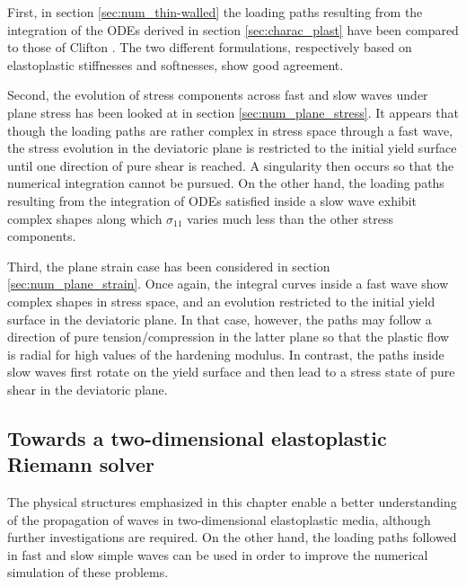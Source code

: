 First, in section \ref{sec:num_thin-walled} the loading paths resulting from the integration of the ODEs derived in section \ref{sec:charac_plast} have been compared to those of Clifton \cite{Clifton}.
The two different formulations, respectively based on elastoplastic stiffnesses and softnesses, show  good agreement.

Second, the evolution of stress components across fast and slow waves under plane stress has been looked at in section \ref{sec:num_plane_stress}.
It appears that though the loading paths are rather complex in stress space through a fast wave, the stress evolution in the deviatoric plane is restricted to the initial yield surface until one direction of pure shear is reached.
A singularity then occurs so that the numerical integration cannot be pursued.
On the other hand, the loading paths resulting from the integration of ODEs satisfied inside a slow wave exhibit complex shapes along which $\sigma_{11}$ varies much less than the other stress components.

Third, the plane strain case has been considered in section \ref{sec:num_plane_strain}.
Once again, the integral curves inside a fast wave show complex shapes in stress space, and an evolution restricted to the initial yield surface in the deviatoric plane.
In that case, however, the paths may follow a direction of pure tension/compression in the latter plane so that the plastic flow is radial for high values of the hardening modulus. 
In contrast, the paths inside slow waves first rotate on the yield surface and then lead to a stress state of pure shear in the deviatoric plane.

\subsection{Towards a two-dimensional elastoplastic Riemann solver}
The physical structures emphasized in this chapter enable a better understanding of the propagation of waves in two-dimensional elastoplastic media, although further investigations are required.
On the other hand, the loading paths followed in fast and slow simple waves can be used in order to improve the numerical simulation of these problems.

